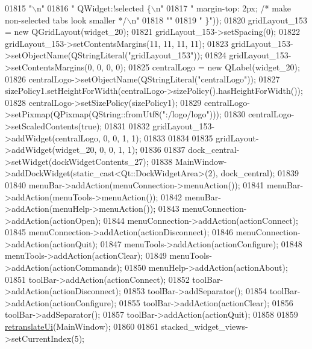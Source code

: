 \begin{DoxyCode}
01815 \textcolor{stringliteral}{"\(\backslash\)n"}
01816 \textcolor{stringliteral}{" QWidget:!selected \{\(\backslash\)n"}
01817 \textcolor{stringliteral}{"     margin-top: 2px; /* make non-selected tabs look smaller */\(\backslash\)n"}
01818 \textcolor{stringliteral}{""}
01819                         \textcolor{stringliteral}{" \}"}));
01820         gridLayout\_153 = \textcolor{keyword}{new} QGridLayout(widget\_20);
01821         gridLayout\_153->setSpacing(0);
01822         gridLayout\_153->setContentsMargins(11, 11, 11, 11);
01823         gridLayout\_153->setObjectName(QStringLiteral(\textcolor{stringliteral}{"gridLayout\_153"}));
01824         gridLayout\_153->setContentsMargins(0, 0, 0, 0);
01825         centralLogo = \textcolor{keyword}{new} QLabel(widget\_20);
01826         centralLogo->setObjectName(QStringLiteral(\textcolor{stringliteral}{"centralLogo"}));
01827         sizePolicy1.setHeightForWidth(centralLogo->sizePolicy().hasHeightForWidth());
01828         centralLogo->setSizePolicy(sizePolicy1);
01829         centralLogo->setPixmap(QPixmap(QString::fromUtf8(\textcolor{stringliteral}{":/logo/logo"})));
01830         centralLogo->setScaledContents(\textcolor{keyword}{true});
01831 
01832         gridLayout\_153->addWidget(centralLogo, 0, 0, 1, 1);
01833 
01834 
01835         gridLayout->addWidget(widget\_20, 0, 0, 1, 1);
01836 
01837         dock\_central->setWidget(dockWidgetContents\_27);
01838         MainWindow->addDockWidget(static\_cast<Qt::DockWidgetArea>(2), dock\_central);
01839 
01840         menuBar->addAction(menuConnection->menuAction());
01841         menuBar->addAction(menuTools->menuAction());
01842         menuBar->addAction(menuHelp->menuAction());
01843         menuConnection->addAction(actionOpen);
01844         menuConnection->addAction(actionConnect);
01845         menuConnection->addAction(actionDisconnect);
01846         menuConnection->addAction(actionQuit);
01847         menuTools->addAction(actionConfigure);
01848         menuTools->addAction(actionClear);
01849         menuTools->addAction(actionCommands);
01850         menuHelp->addAction(actionAbout);
01851         toolBar->addAction(actionConnect);
01852         toolBar->addAction(actionDisconnect);
01853         toolBar->addSeparator();
01854         toolBar->addAction(actionConfigure);
01855         toolBar->addAction(actionClear);
01856         toolBar->addSeparator();
01857         toolBar->addAction(actionQuit);
01858 
01859         \hyperlink{a00027_a097dd160c3534a204904cb374412c618}{retranslateUi}(MainWindow);
01860 
01861         stacked\_widget\_views->setCurrentIndex(5);

\end{DoxyCode}
